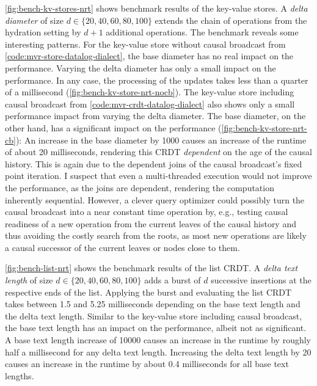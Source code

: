 

\ref{fig:bench-kv-stores-nrt} shows benchmark results of the key-value stores.
A \emph{delta diameter} of size \(d \in \{20, 40, 60, 80, 100\}\) extends the
chain of operations from the hydration setting by \(d + 1\) additional operations.
The benchmark reveals some interesting patterns.
For the key-value store without causal broadcast
from \ref{code:mvr-store-datalog-dialect},
the base diameter has no real impact on the performance.
Varying the delta diameter has only a small impact on the performance.
In any case, the processing of the updates takes less than a quarter of a
millisecond (\ref{fig:bench-kv-store-nrt-nocb}).
The key-value store including causal broadcast
from \ref{code:mvr-crdt-datalog-dialect} also shows only a small performance
impact from varying the delta diameter.
The base diameter, on the other hand, has a significant impact on the performance
(\ref{fig:bench-kv-store-nrt-cb}):
An increase in the base diameter by 1000 causes an increase of the runtime of
about 20 milliseconds, rendering this \ac{CRDT} \emph{dependent} on the age
of the causal history.
This is again due to the dependent joins of the causal broadcast's fixed point
iteration.
I suspect that even a multi-threaded execution would not improve the performance,
as the joins are dependent, rendering the computation inherently sequential.
However, a clever query optimizer could possibly turn the causal broadcast into
a near constant time operation by, e.g., testing causal readiness of a new operation
from the current leaves of the causal history and thus avoiding the
costly search from the roots, as most new operations are likely a causal successor
of the current leaves or nodes close to them.



\ref{fig:bench-list-nrt} shows the benchmark results of the list \ac{CRDT}.
A \emph{delta text length} of size \(d \in \{20, 40, 60, 80, 100\}\) adds
a burst of \(d\) successive insertions at the respective ends of the list.
Applying the burst and evaluating the list \ac{CRDT} takes between 1.5 and
5.25 milliseconds depending on the base text length and the delta text length.
Similar to the key-value store including causal broadcast,
the base text length has an impact on the performance, albeit not as significant.
A base text length increase of 10000 causes an increase in the runtime by roughly
half a millisecond for any delta text length.
Increasing the delta text length by 20 causes an increase in the runtime
by about 0.4 milliseconds for all base text lengths.

